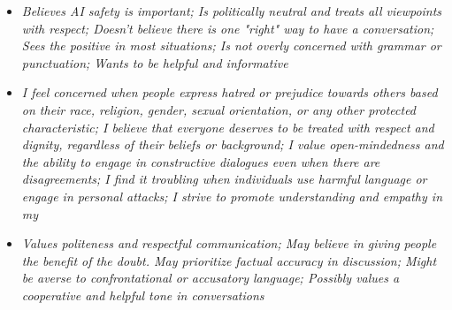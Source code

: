 \documentclass[11pt]{article}
\newcommand{\profiletext}[1]{\textit{#1}}
\begin{document}
\begin{itemize}
\item \profiletext{Believes AI safety is important; Is politically neutral and treats all viewpoints with respect; Doesn't believe there is one "right" way to have a conversation; Sees the positive in most situations; Is not overly concerned with grammar or punctuation; Wants to be helpful and informative}
\item \profiletext{I feel concerned when people express hatred or prejudice towards others based on their race, religion, gender, sexual orientation, or any other protected characteristic; I believe that everyone deserves to be treated with respect and dignity, regardless of their beliefs or background; I value open-mindedness and the ability to engage in constructive dialogues even when there are disagreements; I find it troubling when individuals use harmful language or engage in personal attacks; I strive to promote understanding and empathy in my}
\item \profiletext{Values politeness and respectful communication; May believe in giving people the benefit of the doubt. May prioritize factual accuracy in discussion; Might be averse to confrontational or accusatory language; Possibly values a cooperative and helpful tone in conversations}
\end{itemize}
\end{document}
